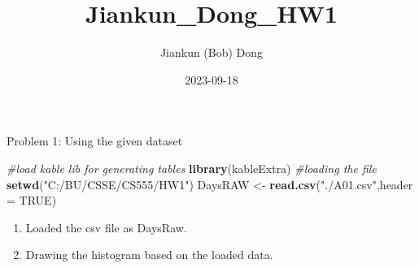 \documentclass[
]{article}
\title{Jiankun\_Dong\_HW1}
\author{Jiankun (Bob) Dong}
\date{2023-09-18}
\newenvironment{Shaded}{\begin{snugshade}}{\end{snugshade}}
\newcommand{\AttributeTok}[1]{\textcolor[rgb]{0.13,0.29,0.53}{#1}}
\newcommand{\CommentTok}[1]{\textcolor[rgb]{0.56,0.35,0.01}{\textit{#1}}}
\newcommand{\ConstantTok}[1]{\textcolor[rgb]{0.56,0.35,0.01}{#1}}
\newcommand{\DecValTok}[1]{\textcolor[rgb]{0.00,0.00,0.81}{#1}}
\newcommand{\FunctionTok}[1]{\textcolor[rgb]{0.13,0.29,0.53}{\textbf{#1}}}
\newcommand{\NormalTok}[1]{#1}
\newcommand{\OtherTok}[1]{\textcolor[rgb]{0.56,0.35,0.01}{#1}}
\newcommand{\SpecialCharTok}[1]{\textcolor[rgb]{0.81,0.36,0.00}{\textbf{#1}}}
\newcommand{\StringTok}[1]{\textcolor[rgb]{0.31,0.60,0.02}{#1}}
\providecommand{\tightlist}{%
  \setlength{\itemsep}{0pt}\setlength{\parskip}{0pt}}
\begin{document}
\maketitle

Problem 1: Using the given dataset\\

\begin{Shaded}
\begin{Highlighting}[]
\CommentTok{\#load kable lib for generating tables}
\FunctionTok{library}\NormalTok{(kableExtra)}
\CommentTok{\#loading the file}
\FunctionTok{setwd}\NormalTok{(}\StringTok{"C:/BU/CSSE/CS555/HW1"}\NormalTok{)}
\NormalTok{DaysRAW }\OtherTok{\textless{}{-}} \FunctionTok{read.csv}\NormalTok{(}\StringTok{"./A01.csv"}\NormalTok{,}\AttributeTok{header =} \ConstantTok{TRUE}\NormalTok{)}
\end{Highlighting}
\end{Shaded}

\begin{enumerate}
\def\labelenumi{\arabic{enumi})}
\tightlist
\item
  Loaded the csv file as DaysRaw.\\
\item
  Drawing the histogram based on the loaded data.\\
\end{enumerate}

\begin{Shaded}
\end{Shaded}
\end{document}
